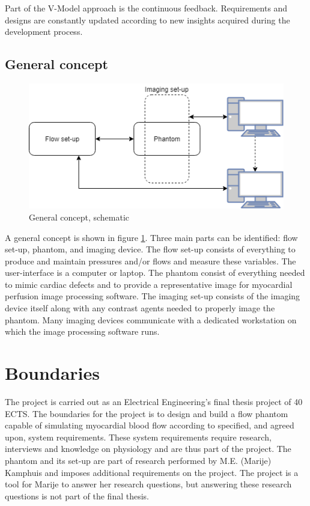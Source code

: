 Part of the V-Model approach is the continuous feedback. Requirements and designs are constantly updated according to new insights acquired during the development process. 

\subsection{General concept}
\begin{figure}[b!]
	\begin{center}
		\includegraphics[width=0.75\linewidth]{images/global_setup.png}
	\end{center}
	\caption{General concept, schematic}
	\label{fig:general_concept}
\end{figure}
A general concept is shown in figure \ref{fig:general_concept}. Three main parts can be identified: flow set-up, phantom, and imaging device. The flow set-up consists of everything to produce and maintain pressures and/or flows and measure these variables. The user-interface is a computer or laptop. The phantom consist of everything needed to mimic cardiac defects and to provide a representative image for myocardial perfusion image processing software. The imaging set-up consists of the imaging device itself along with any contrast agents needed to properly image the phantom. Many imaging devices communicate with a dedicated workstation on which the image processing software runs.

\section{Boundaries}
The project is carried out as an Electrical Engineering's final thesis project of 40 \ac{ECTS}. The boundaries for the project is to design and build a flow phantom capable of simulating myocardial blood flow according to specified, and agreed upon, system requirements. These system requirements require research, interviews and knowledge on physiology and are thus part of the project. The phantom and its set-up are part of research performed by M.E. (Marije) Kamphuis and imposes additional requirements on the project. The project is a tool for Marije to answer her research questions, but answering these research questions is not part of the final thesis. 

